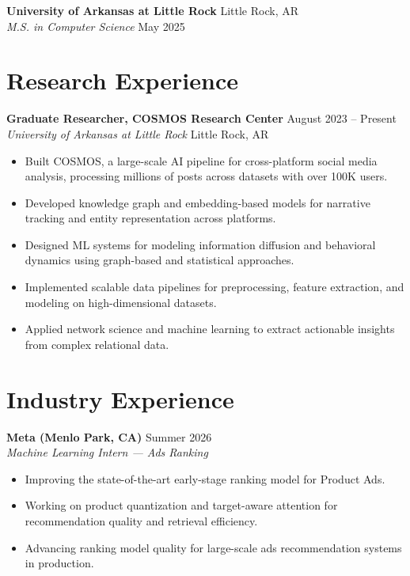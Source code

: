 \documentclass[11pt, letterpaper]{article}
\newcommand{\cvheading}[2]{%
  \noindent\textbf{#1} \hfill \textcolor{mutedgray}{\small #2}%
}
\newcommand{\cvsub}[2]{%
  \noindent\textit{#1} \hfill \textcolor{mutedgray}{\small #2}%
}
\begin{document}
\vspace{6pt}

\cvheading{University of Arkansas at Little Rock}{Little Rock, AR}\\
\cvsub{M.S. in Computer Science}{May 2025}

\section{Research Experience}

\cvheading{Graduate Researcher, COSMOS Research Center}{August 2023 -- Present}\\
\cvsub{University of Arkansas at Little Rock}{Little Rock, AR}
\begin{itemize}
  \item Built COSMOS, a large-scale AI pipeline for cross-platform social media analysis, processing millions of posts across datasets with over 100K users.
  \item Developed knowledge graph and embedding-based models for narrative tracking and entity representation across platforms.
  \item Designed ML systems for modeling information diffusion and behavioral dynamics using graph-based and statistical approaches.
  \item Implemented scalable data pipelines for preprocessing, feature extraction, and modeling on high-dimensional datasets.
  \item Applied network science and machine learning to extract actionable insights from complex relational data.
\end{itemize}

\section{Industry Experience}

\cvheading{Meta (Menlo Park, CA)}{Summer 2026}\\
\cvsub{Machine Learning Intern — Ads Ranking}{}
\begin{itemize}
  \item Improving the state-of-the-art early-stage ranking model for Product Ads.
  \item Working on product quantization and target-aware attention for recommendation quality and retrieval efficiency.
  \item Advancing ranking model quality for large-scale ads recommendation systems in production.
\end{itemize}
\end{document}
